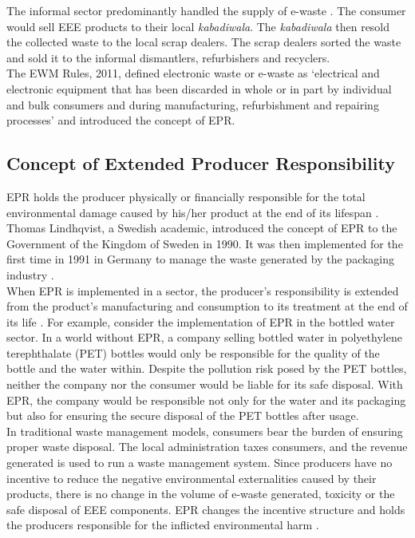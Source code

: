 \documentclass[a4paper, 12pt]{article}
\begin{document}
                    The informal sector predominantly handled the supply of e-waste \parencite{thakurnews}. The consumer would sell EEE products to their local \textit{kabadiwala}. The \textit{kabadiwala} then resold the collected waste to the local scrap dealers. The scrap dealers sorted the waste and sold it to the informal dismantlers, refurbishers and recyclers. \\
                    
                    The EWM Rules, 2011, defined electronic waste or e-waste as ‘electrical and electronic equipment that has been discarded in whole or in part by individual and bulk consumers and during manufacturing, refurbishment and repairing processes’ and introduced the concept of EPR. 

\subsection{Concept of Extended Producer Responsibility}
                    
                    EPR holds the producer physically or financially responsible for the total environmental damage caused by his/her product at the end of its lifespan \parencite{wallschapter}. Thomas Lindhqvist, a Swedish academic, introduced the concept of EPR to the Government of the Kingdom of Sweden in 1990. It was then implemented for the first time in 1991 in Germany to manage the waste generated by the packaging industry \parencite{toxicspaper}. \\
                    
                    When EPR is implemented in a sector, the producer’s responsibility is extended from the product’s manufacturing and consumption to its treatment at the end of its life \parencite{toxicspaper}. For example, consider the implementation of EPR in the bottled water sector. In a world without EPR, a company selling bottled water in polyethylene terephthalate (PET) bottles would only be responsible for the quality of the bottle and the water within. Despite the pollution risk posed by the PET bottles, neither the company nor the consumer would be liable for its safe disposal. With EPR, the company would be responsible not only for the water and its packaging but also for ensuring the secure disposal of the PET bottles after usage. \\
                    
                    In traditional waste management models, consumers bear the burden of ensuring proper waste disposal. The local administration taxes consumers, and the revenue generated is used to run a waste management system. Since producers have no incentive to reduce the negative environmental externalities caused by their products, there is no change in the volume of e-waste generated, toxicity or the safe disposal of EEE components. EPR changes the incentive structure and holds the producers responsible for the inflicted environmental harm \parencite{bhaskarturagapaperb}. 
\end{document}
